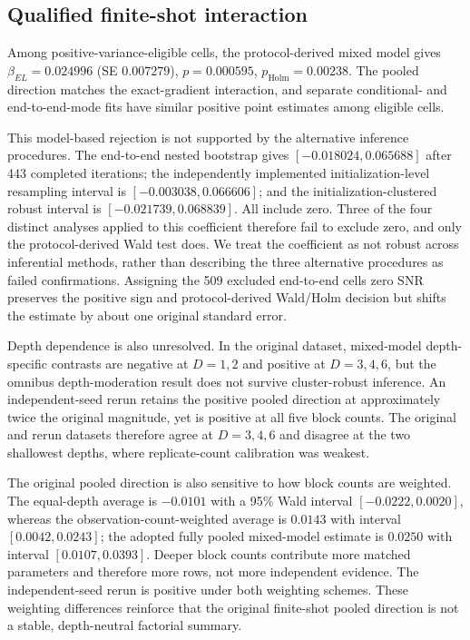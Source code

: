 \documentclass[pdflatex,sn-basic,Numbered]{sn-jnl}
\begin{document}
\subsection{Qualified finite-shot interaction}\label{sec:h2-result}

Among positive-variance-eligible cells, the protocol-derived mixed model gives $\beta_{EL}=0.024996$ (SE $0.007279$), $p=0.000595$, $p_{\mathrm{Holm}}=0.00238$. The pooled direction matches the exact-gradient interaction, and separate conditional- and end-to-end-mode fits have similar positive point estimates among eligible cells.

This model-based rejection is not supported by the alternative inference procedures. The end-to-end nested bootstrap gives $[-0.018024,0.065688]$ after 443 completed iterations; the independently implemented initialization-level resampling interval is $[-0.003038,0.066606]$; and the initialization-clustered robust interval is $[-0.021739,0.068839]$. All include zero. Three of the four distinct analyses applied to this coefficient therefore fail to exclude zero, and only the protocol-derived Wald test does. We treat the coefficient as not robust across inferential methods, rather than describing the three alternative procedures as failed confirmations. Assigning the 509 excluded end-to-end cells zero SNR preserves the positive sign and protocol-derived Wald/Holm decision but shifts the estimate by about one original standard error.

Depth dependence is also unresolved. In the original dataset, mixed-model depth-specific contrasts are negative at $D=1,2$ and positive at $D=3,4,6$, but the omnibus depth-moderation result does not survive cluster-robust inference. An independent-seed rerun retains the positive pooled direction at approximately twice the original magnitude, yet is positive at all five block counts. The original and rerun datasets therefore agree at $D=3,4,6$ and disagree at the two shallowest depths, where replicate-count calibration was weakest.


The original pooled direction is also sensitive to how block counts are weighted. The equal-depth average is $-0.0101$ with a 95\% Wald interval $[-0.0222,0.0020]$, whereas the observation-count-weighted average is $0.0143$ with interval $[0.0042,0.0243]$; the adopted fully pooled mixed-model estimate is $0.0250$ with interval $[0.0107,0.0393]$. Deeper block counts contribute more matched parameters and therefore more rows, not more independent evidence. The independent-seed rerun is positive under both weighting schemes. These weighting differences reinforce that the original finite-shot pooled direction is not a stable, depth-neutral factorial summary.
\end{document}
